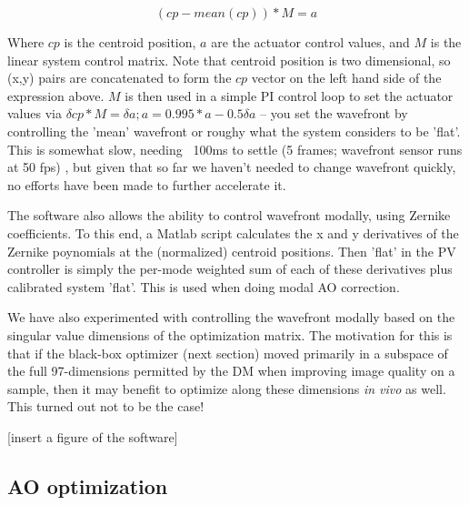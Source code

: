 \documentclass[a4paper,12pt]{article}
\begin{document}
$$ (cp - mean(cp)) * M = a $$

Where $cp$ is the centroid position, $a$ are the actuator control values, and $M$ is the linear system control matrix.  Note that centroid position is two dimensional, so (x,y) pairs are concatenated to form the $cp$ vector on the left hand side of the expression above. $M$ is then used in a simple PI control loop to set the actuator values via $\delta cp * M = \delta a ; a = 0.995 * a - 0.5 \delta a$ -- you set the wavefront by controlling the 'mean' wavefront or roughy what the system considers to be 'flat'.  This is somewhat slow, needing ~100ms to settle (5 frames; wavefront sensor runs at 50 fps) , but given that so far we haven't needed to change wavefront quickly, no efforts have been made to further accelerate it.  

The software also allows the ability to control wavefront modally, using Zernike coefficients.   To this end, a Matlab script calculates the x and y derivatives of the Zernike poynomials at the (normalized) centroid positions.  Then 'flat' in the PV controller is simply the per-mode weighted sum of each of these derivatives plus calibrated system 'flat'.  This is used when doing modal AO correction.  

We have also experimented with controlling the wavefront modally based on the singular value dimensions of the optimization matrix.  The motivation for this is that if the black-box optimizer (next section) moved primarily in a subspace of the full 97-dimensions permitted by the DM when improving image quality on a sample, then it may benefit to optimize along these dimensions \textit{in vivo} as well.  This turned out not to be the case!  

[insert a figure of the software] 

\subsection {AO optimization}
\end{document}
